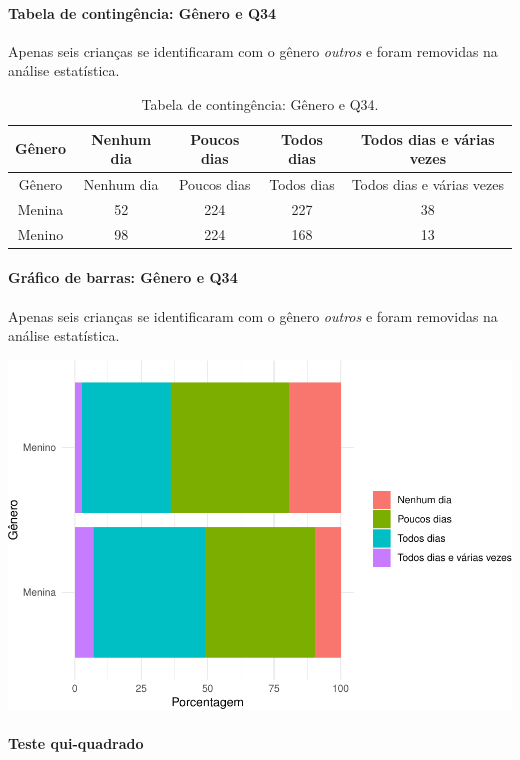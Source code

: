 \documentclass[]{article}
\let\oldparagraph\paragraph
\renewcommand{\paragraph}[1]{\oldparagraph{#1}\mbox{}}
\begin{document}
\cleardoublepage

\hypertarget{tabela-de-continguxeancia-guxeanero-e-q34}{%
\paragraph{Tabela de contingência: Gênero e Q34}\label{tabela-de-continguxeancia-guxeanero-e-q34}}

Apenas seis crianças se identificaram com o gênero \emph{outros} e foram removidas na análise estatística.

\begin{longtable}[]{@{}ccccc@{}}
\caption{\label{tab:unnamed-chunk-1202}Tabela de contingência: Gênero e Q34.}\tabularnewline
\toprule
Gênero & Nenhum dia & Poucos dias & Todos dias & Todos dias e várias vezes\tabularnewline
\midrule
\endfirsthead
\toprule
Gênero & Nenhum dia & Poucos dias & Todos dias & Todos dias e várias vezes\tabularnewline
\midrule
\endhead
Menina & 52 & 224 & 227 & 38\tabularnewline
Menino & 98 & 224 & 168 & 13\tabularnewline
\bottomrule
\end{longtable}

\hypertarget{gruxe1fico-de-barras-guxeanero-e-q34}{%
\paragraph{Gráfico de barras: Gênero e Q34}\label{gruxe1fico-de-barras-guxeanero-e-q34}}

Apenas seis crianças se identificaram com o gênero \emph{outros} e foram removidas na análise estatística.

\begin{center}\includegraphics[width=0.75\linewidth]{relatorio_covid19_files/figure-latex/unnamed-chunk-1203-1} \end{center}

\hypertarget{teste-qui-quadrado-103}{%
\paragraph{Teste qui-quadrado}\label{teste-qui-quadrado-103}}
\end{document}
